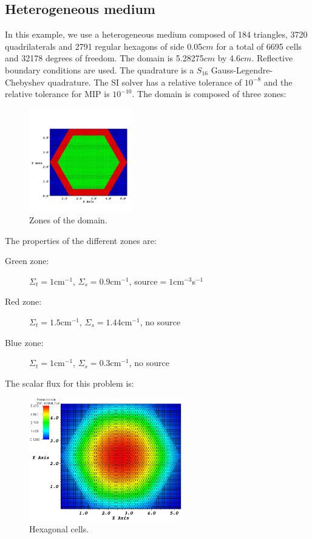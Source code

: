 \subsection{Heterogeneous medium}
In this example, we use a heterogeneous medium composed of 184 triangles, 3720
quadrilaterals and 2791 regular hexagons of side 0.05$cm$ for a total of 6695 
cells and 32178 degrees of freedom. The domain is 5.28275$cm$ by 4.6$cm$. 
Reflective boundary conditions are used. The quadrature is a $S_{16}$ 
Gauss-Legendre-Chebyshev quadrature. The SI solver has a relative tolerance of 
$10^{-8}$ and the relative tolerance for MIP is $10^{-10}$. The domain is 
composed of three zones:
\begin{figure}[H]
\centering
\includegraphics[width=0.4\textwidth]{source_crop}
\caption{Zones of the domain.}
\end{figure}
The properties of the different zones are:
\begin{description}
\item[Green zone:] $\Sigma_t =1$cm$^{-1}$, $\Sigma_s = 0.9$cm$^{-1}$, source$ =
1$cm$^{-3}$s$^{-1}$
\item[Red zone:] $\Sigma_t = 1.5$cm$^{-1}$, $\Sigma_s = 1.44$cm$^{-1}$, no source
\item[Blue zone:] $\Sigma_t = 1$cm$^{-1}$, $\Sigma_s = 0.3$cm$^{-1}$, no source
\end{description}
The scalar flux for this problem is:
\begin{figure}[H]
\centering
\includegraphics[width=0.6\textwidth]{heterog_hex_crop}
\caption{Hexagonal cells.}
\end{figure}
